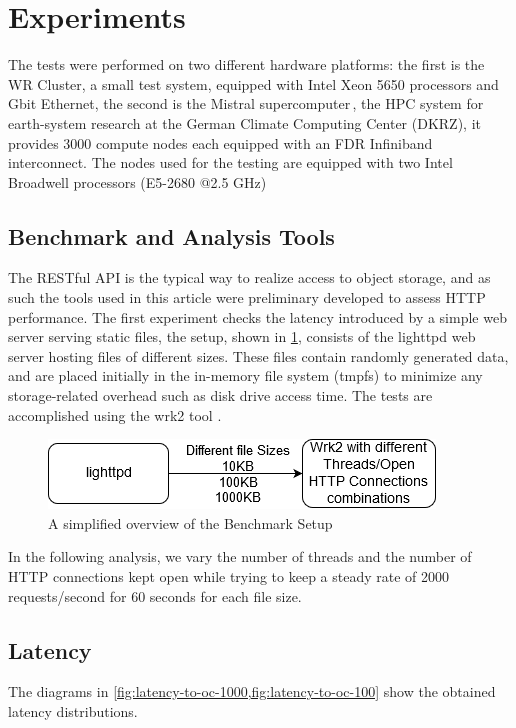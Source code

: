 \documentclass[runningheads]{llncs}
\begin{document}
\section{Experiments}
\label{sec:experiments}
The tests were performed on two different hardware platforms: the first is the WR Cluster, a small test system, equipped with Intel Xeon 5650 processors and Gbit Ethernet, the second is the Mistral supercomputer\,\cite{mistral}, the HPC system for earth-system research at the German Climate Computing Center (DKRZ), it provides 3000 compute nodes each equipped with an FDR Infiniband interconnect. The nodes used for the testing are equipped with two Intel Broadwell processors (E5-2680 @2.5 GHz) \cite{intel-xeon}

\subsection{Benchmark and Analysis Tools}\label{subsec:benchmark1}
The RESTful API is the typical way to realize access to object storage, and as such the tools used in this article were preliminary developed to assess HTTP performance.
The first experiment checks the latency introduced by a simple web server serving static files, the setup, shown in \cref{fig:wrk2bench}, consists of the lighttpd web server \cite{lighttpd} hosting files of different sizes. These files contain randomly generated data, and are placed initially in the in-memory file system (tmpfs) to minimize any storage-related overhead such as disk drive access time. The tests are accomplished using the wrk2 tool \cite{wrk2URL}.
\vspace{-1.5em}
\begin{figure}
\centering
\includegraphics[width=.6\linewidth]{wrk2bench.png}
\caption{A simplified overview of the Benchmark Setup}
\vspace{-1.5em}
\label{fig:wrk2bench}
\end{figure}
In the following analysis, we vary the number of threads and the number of HTTP connections kept open while trying to keep a steady rate of 2000 requests/second for 60 seconds for each file size.
\subsection{Latency}\label{subsec:latency}
The diagrams in \cref{fig:latency-to-oc-1000,fig:latency-to-oc-100} show the obtained latency distributions.
\end{document}
